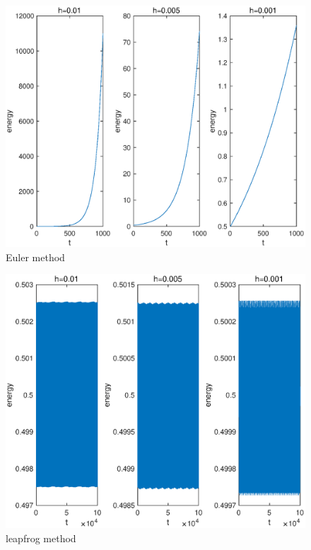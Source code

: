 \documentclass[12pt]{article}%
\begin{document}
\begin{figure}  
\centering  
\includegraphics[scale=0.5]{euler3.eps} 
\caption{Euler method}  
\label{euler3}
\end{figure}
\begin{figure}  
\centering  
\includegraphics[scale=0.5]{leapfrog3.eps} 
\caption{leapfrog method}  
\label{leapfrog3}
\end{figure}
\end{document}
